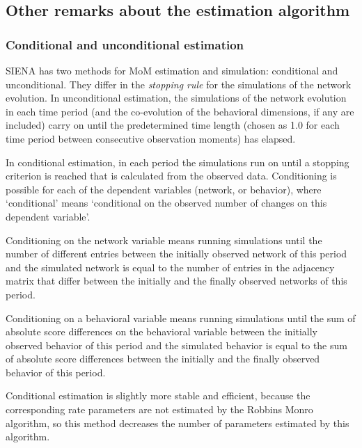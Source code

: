 \documentclass[a4paper,fleqn,11pt]{article}
\newcommand{\+}{\, + \,}
\newcommand{\SI}{{\sf SIENA }}
\begin{document}
\subsection{Other remarks about the estimation algorithm}

\subsubsection{Conditional and unconditional estimation}
\label{S_cond}

\SI has two methods for MoM estimation and simulation:
\hypertarget{T_S_cond}{conditional and unconditional}. They differ
in the {\em stopping rule} for the simulations of the network
evolution. In unconditional estimation, the simulations of the
network evolution in each time period (and the co-evolution of the
behavioral dimensions, if any are included) carry on until the
predetermined time length (chosen as 1.0
for each time period between consecutive observation moments) has elapsed.

In conditional estimation, in each period
the simulations run on until a stopping
criterion is reached that is calculated from the observed data.
Conditioning is possible for each of the dependent variables
(network, or behavior), where `conditional' means `conditional on
the observed number of changes on this dependent variable'.

Conditioning on the network variable means running simulations
until the number of different entries between the initially
observed network of this period and the simulated network
\hypertarget{T_distance_stop}{is equal to the number} of entries
in the adjacency matrix that differ between the initially and the
finally observed networks of this period.

Conditioning on a behavioral variable means running simulations
until the sum of absolute score differences on the behavioral
variable between the initially observed behavior of this period
and the simulated behavior is equal to the sum of absolute score
differences between the initially and the finally observed
behavior of this period.

Conditional estimation is slightly more stable and efficient,
because the corresponding rate parameters are not estimated by the
Robbins Monro algorithm, so this method decreases the number of
parameters estimated by this algorithm.
\medskip
\end{document}
